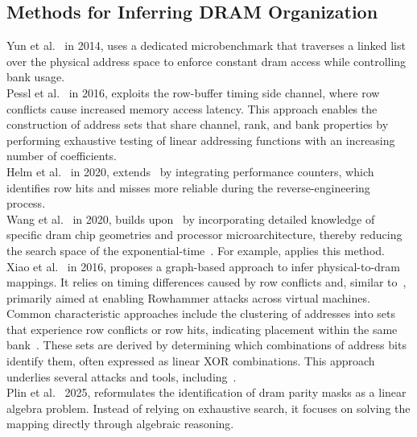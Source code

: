     \subsection{Methods for Inferring DRAM Organization} \label{subsec:methods}
        Yun et al.~\cite{paperPALLOC} in 2014, uses a dedicated microbenchmark 
        that traverses a linked list over the physical address space to enforce constant \gls{dram} 
        access while controlling bank usage.
        \\
        Pessl et al.~\cite{paperDRAMA} in 2016, exploits the row-buffer timing side 
        channel, where row conflicts cause increased memory access latency. This approach 
        enables the construction of address sets that share channel, rank, and bank 
        properties by performing exhaustive testing of linear addressing functions with an 
        increasing number of coefficients.
        \\
        Helm et al.~\cite{paperReliableReverseEngineering} in 2020, extends~\cite{paperDRAMA} by integrating 
        performance counters, which identifies row hits and misses more reliable 
        during the reverse-engineering process.
        \\
        Wang et al.~\cite{paperDRAMDig} in 2020, builds upon~\cite{paperDRAMA} by incorporating 
        detailed knowledge of specific \gls{dram} chip geometries and processor microarchitecture, thereby 
        reducing the search space of the exponential-time~\cite{paperKnockKnock}. For example, \cite{paperDRAMMaUT} applies this method.
        \\
        Xiao et al.~\cite{paperOneBitFlipsOneCouldFlops} in 2016, proposes a graph-based 
        approach to infer physical-to-\gls{dram} mappings. It relies on timing differences caused by 
        row conflicts and, similar to~\cite{paperDRAMA}, primarily aimed at enabling Rowhammer attacks 
        across virtual machines.
        \\
        Common characteristic approaches include the clustering of addresses into 
        sets that experience row conflicts or row hits, indicating placement within the same bank~\cite{paperHalfDouble}. 
        These sets are derived by determining which combinations of address bits identify them, 
        often expressed as linear XOR combinations. This approach underlies several attacks 
        and tools, including~\cite{paperDrammer, paperHalfDouble, thesisCacheAttacksandRH}.
        \\
        Plin et al.~\cite{paperKnockKnock} 2025, reformulates the identification of 
        \gls{dram} parity masks as a linear algebra problem. Instead of relying on exhaustive search, it 
        focuses on solving the mapping directly through algebraic reasoning.

